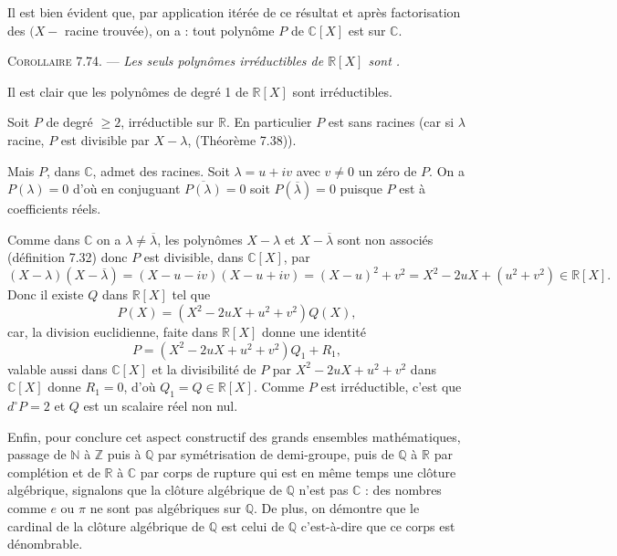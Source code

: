 Il est bien évident que, par application itérée de ce résultat et après factorisation des $(X-$ racine trouvée$)$, on a : tout polynôme $P$ de $\mathbb C[X]$ est  sur $\mathbb C$. \bookend

\medskip\noindent\textsc{Corollaire 7.74.} --- \emph{Les seuls polynômes irréductibles de $\mathbb R[X]$ sont .}

Il est clair que les polynômes de degré 1 de $\mathbb R[X]$ sont irréductibles.

Soit $P$ de degré $\ge2$, irréductible sur $\mathbb R$. En particulier $P$ est sans racines  (car si $\lambda$ racine, $P$ est divisible par $X-\lambda$, (Théorème 7.38)).

Mais $P$, dans $\mathbb C$, admet des racines. Soit $\lambda=u+iv$ avec $v\ne0$ un zéro de $P$. On a $P(\lambda)=0$ d'où en conjuguant $\overline{P(\lambda)}=0$ soit $P(\overline\lambda)=0$ puisque $P$ est à coefficients réels.

Comme dans $\mathbb C$ on a $\lambda\ne\overline\lambda$, les polynômes $X-\lambda$ et $X-\overline\lambda$ sont non associés (définition 7.32) donc $P$ est divisible, dans $\mathbb C[X]$, par
\[
(X-\lambda)(X-\overline\lambda)=(X-u-iv)(X-u+iv)
=(X-u)^2+v^2=X^2-2uX+(u^2+v^2)\in\mathbb R[X].
\]
Donc il existe $Q$ dans $\mathbb R[X]$ tel que
\[
P(X)=(X^2-2uX+u^2+v^2)Q(X),
\]
car, la division euclidienne, faite dans $\mathbb R[X]$ donne une identité
\[
P=(X^2-2uX+u^2+v^2)Q_1+R_1,
\]
valable aussi dans $\mathbb C[X]$ et la divisibilité de $P$ par $X^2-2uX+u^2+v^2$ dans $\mathbb C[X]$ donne $R_1=0$, d'où $Q_1=Q\in\mathbb R[X]$. Comme $P$ est irréductible, c'est que $d^\circ P=2$ et $Q$ est un scalaire réel non nul. \bookend

Enfin, pour conclure cet aspect constructif des grands ensembles mathématiques, passage de $\mathbb N$ à $\mathbb Z$ puis à $\mathbb Q$ par symétrisation de demi-groupe, puis de $\mathbb Q$ à $\mathbb R$ par complétion et de $\mathbb R$ à $\mathbb C$ par corps de rupture qui est en même temps une clôture algébrique, signalons que la clôture algébrique de $\mathbb Q$ n'est pas $\mathbb C$ : des nombres  comme $e$ ou $\pi$ ne sont pas algébriques sur $\mathbb Q$. De plus, on démontre que le cardinal de la clôture algébrique de $\mathbb Q$ est celui de $\mathbb Q$ c'est-à-dire que ce corps est dénombrable.
